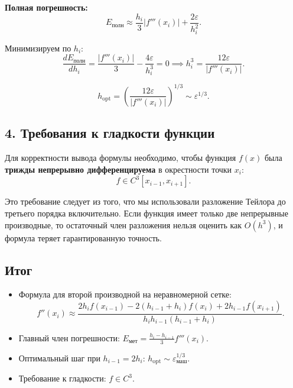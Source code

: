 \documentclass{article}
\begin{document}
\textbf{Полная погрешность:}
\begin{equation}
E_{\text{полн}} \approx \frac{h_i}{3} |f'''(x_i)| + \frac{2\varepsilon}{h_i^2}.
\end{equation}

Минимизируем по $h_i$:
\begin{equation}
\frac{dE_{\text{полн}}}{dh_i} = \frac{|f'''(x_i)|}{3} - \frac{4\varepsilon}{h_i^3} = 0
\implies h_i^3 = \frac{12\varepsilon}{|f'''(x_i)|}.
\end{equation}

\begin{equation}
\boxed{h_{\text{opt}} = \left(\frac{12\varepsilon}{|f'''(x_i)|}\right)^{1/3} \sim \varepsilon^{1/3}.}
\end{equation}

\subsection*{4. Требования к гладкости функции}

Для корректности вывода формулы необходимо, чтобы функция $f(x)$ была \textbf{трижды непрерывно дифференцируема} в окрестности точки $x_i$:
\begin{equation}
f \in C^3[x_{i-1}, x_{i+1}].
\end{equation}

Это требование следует из того, что мы использовали разложение Тейлора до третьего порядка включительно. Если функция имеет только две непрерывные производные, то остаточный член разложения нельзя оценить как $O(h^3)$, и формула теряет гарантированную точность.

\subsection*{Итог}

\begin{itemize}
\item Формула для второй производной на неравномерной сетке:
\begin{equation}
f''(x_i) \approx \frac{2 h_i f(x_{i-1}) - 2(h_{i-1} + h_i) f(x_i) + 2 h_{i-1} f(x_{i+1})}{h_i h_{i-1} (h_{i-1} + h_i)}.
\end{equation}
\item Главный член погрешности: $E_{\text{мет}} = \frac{h_i - h_{i-1}}{3} f'''(x_i)$.
\item Оптимальный шаг при $h_{i-1} = 2h_i$: $h_{\text{opt}} \sim \varepsilon_{\text{маш}}^{1/3}$.
\item Требование к гладкости: $f \in C^3$.
\end{itemize}
\end{document}
